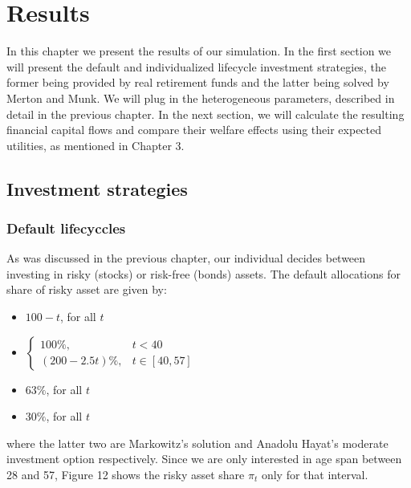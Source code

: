 \documentclass[]{article}
\begin{document}
\section{Results}
\label{results}

In this chapter we present the results of our simulation. In the first section we will present the default and individualized lifecycle investment strategies, the former being provided by real retirement funds and the latter being solved by Merton and Munk. We will plug in the heterogeneous parameters, described in detail in the previous chapter. In the next section, we will calculate the resulting financial capital flows and compare their welfare effects using their expected utilities, as mentioned in Chapter 3. 

\subsection{Investment strategies}
\subsubsection{Default lifecyccles}
As was discussed in the previous chapter, our individual decides between investing in risky (stocks) or risk-free (bonds) assets. The default allocations for share of risky asset are given by:

\begin{itemize}
	\item $100-t$, for all $t$
	\item $\begin{cases} 100\%, & t<40\\(200-2.5t)\%, & t\in[40,57]\end{cases}$
	\item $63\%$, for all $t$
	\item $30\%$, for all $t$
\end{itemize}

where the latter two are Markowitz's solution and Anadolu Hayat's moderate investment option respectively. Since we are only interested in age span between 28 and 57, Figure 12 shows the risky asset share $\pi_t$ only for that interval. 
\end{document}
